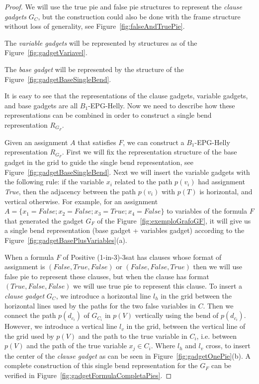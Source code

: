 \documentclass[preprint,12pt]{elsarticle} %
\begin{document}
\begin{proof}

We will use the true pie and false pie structures to represent the \textit{clause gadgets} $ G_C$, but the construction could also be done with the frame structure without loss of generality, see Figure~\ref{fig:falseAndTruePie}.  




The \textit{variable gadgets} will be represented by structures as of the Figure~\ref{fig:gadgetVariavel}.




The \textit{base gadget} will be represented by the structure of the Figure~\ref{fig:gadgetBaseSingleBend}.



It is easy to see that the representations of the clause gadgets, variable gadgets, and base gadgets are all $B_1$-EPG-Helly. Now we need to describe how these representations can be combined in order to construct a single bend representation $R_{G_F}$.

Given an assignment $A$ that satisfies $F$, we can construct a  $B_{1}$-EPG-Helly representation $R_{G_F}$. First we will fix the representation structure of the base gadget in the grid to guide the single bend representation, see Figure~\ref{fig:gadgetBaseSingleBend}. Next we will insert the variable gadgets with the following rule: if the  variable $x_i$ related to the path $p(v_i)$ had assignment \textit{True}, then the adjacency between the path $p(v_i)$ with $p(T)$ is horizontal, and vertical otherwise. For example, for an assignment $A=\{x_1=False; x_2=False;x_3=True; x_4=False\}$  to variables of the formula $F$ that generated the gadget $G_F$ of the Figure~\ref{fig:exemploGrafoGF}, it will give us a single bend representation (base gadget + variables gadget) according to the Figure~\ref{fig:gadgetBasePlusVariables}(a). 

 When a formula $F$ of {\sc Positive (1-in-3)-3sat} has clauses whose format of assignment is $(False, True, False)$ or $(False, False, True)$ then we will use false pie to represent these clauses, but when the clause has format $(True, False, False)$ we will use true pie to represent this clause. To insert a \textit{ clause gadget} $G_{C}$, we introduce a horizontal line $l_{h}$ in the grid between the horizontal lines used by the paths for the two false variables in $ C $. Then we connect the path $p(d_{c_i})$ of $G_{C_i}$ in $p(V)$ vertically using the bend of $p(d_{c_i})$. However, we introduce a vertical line $ l_{v}$ in the grid, between the vertical line of the grid used by $p(V)$ and the path to the true variable in $C_i$, i.e. between $p(V)$ and the path of the true variable $x_j \in C_i$. Where $l_{h}$ and $l_{v}$ cross, to insert the center of the  \textit{clause gadget} as can be seen in Figure~\ref{fig:gadgetOnePie}(b). A complete construction of this single bend representation for the $G_F$ can be verified in 
Figure~\ref{fig:gadgetFormulaCompletaPies}.%


\end{proof}
\end{document}
